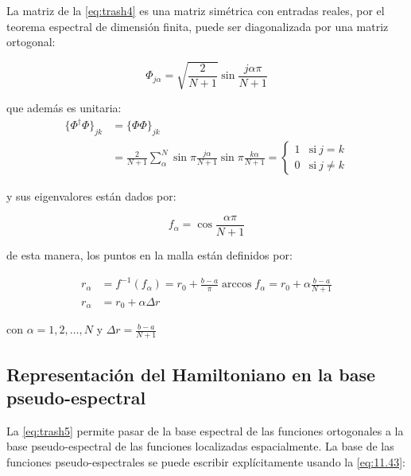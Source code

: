 La matriz de la \autoref{eq:trash4} es una matriz simétrica con entradas reales, por el teorema espectral de dimensión finita, puede ser diagonalizada por una matriz ortogonal:

\begin{equation}
  \label{eq:trash5}
  \Phi_{j\alpha} = \sqrt{\frac{2}{N+1}}\sin{\frac{j\alpha \pi}{N+1}}
\end{equation}

que además es unitaria:
\begin{align}
  \label{eq:unitaryproof}
  \{\Phi^{\dagger} \Phi\}_{jk} &= \{\Phi \Phi\}_{jk} \\
                      &= \frac{2}{N+1} \sum_{\alpha}^{N} \sin{\pi\frac{j\alpha}{N+1}}\sin{\pi\frac{k\alpha}{N+1}} =
                        \begin{cases}
                          1 & \text{si}\ j=k \\
                          0 & \text{si}\ j\neq k
                        \end{cases}
\end{align}


y sus eigenvalores están dados por: \cite{Noschese2012}

\begin{equation}
  \label{eq:trash7}
  f_{\alpha} = \cos{\frac{\alpha \pi}{N+1}}
\end{equation}

de esta manera, los puntos en la malla están definidos por:

\begin{align}
  \label{eq:trash8}
  r_{\alpha} &= f^{-1}(f_{\alpha}) = r_0 + \frac{b-a}{\pi}\arccos{f_{\alpha}} = r_0 + \alpha \frac{b-a}{N+1} \nonumber\\
  r_{\alpha} &= r_0 + \alpha \Delta r
\end{align}

con $\alpha=1,2,\dots,N$ y $\Delta r = \frac{b-a}{N+1}$


\subsection{Representación del Hamiltoniano en la base pseudo-espectral}

La \autoref{eq:trash5} permite pasar de la base espectral de las funciones ortogonales a la base pseudo-espectral de las funciones localizadas espacialmente. La base de las funciones pseudo-espectrales se puede escribir explícitamente usando la \autoref{eq:11.43}:

